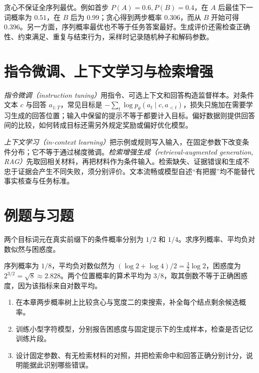 贪心不保证全序列最优。例如首步 $P(A)=0.6,P(B)=0.4$，在 $A$ 后最佳下一词概率为 $0.51$，在 $B$ 后为 $0.99$；贪心得到两步概率 $0.306$，而从 $B$ 开始可得 $0.396$。另一方面，序列概率最优也不等于任务答案最好。生成评价还需检查正确性、约束满足、重复与结束行为，采样时记录随机种子和解码参数。

\section{指令微调、上下文学习与检索增强}
\emph{指令微调（instruction tuning）}用指令、可选上下文和回答构造监督样本。对条件文本 $c$ 与回答 $a_{1:T}$，常见目标是 $-\sum_t\log p_\theta(a_t\mid c,a_{<t})$，损失只施加在需要学习生成的回答位置；输入中保留的提示不等于都要计入目标。偏好数据则提供回答间的比较，如何转成目标还需另外规定奖励或偏好优化模型。

\emph{上下文学习（in-context learning）}把示例或规则写入输入，在固定参数下改变条件分布；它不等于通过梯度微调。\emph{检索增强生成（retrieval-augmented generation, RAG）}先取回相关材料，再把材料作为条件输入。检索缺失、证据错误和生成不忠于证据会产生不同失败，须分别评价。文本流畅或模型自述“有把握”均不能替代事实核查与任务标准。

\section{例题与习题}
\begin{example}[计算词元困惑度]
两个目标词元在真实前缀下的条件概率分别为 $1/2$ 和 $1/4$。求序列概率、平均负对数似然与困惑度。
\end{example}
\begin{solve}
序列概率为 $1/8$，平均负对数似然为 $(\log2+\log4)/2=\frac32\log2$，困惑度为 $2^{3/2}=\sqrt8\approx2.828$。两个位置概率的算术平均为 $3/8$，取其倒数不等于正确困惑度，因为该指标来自对数平均。
\end{solve}
\begin{enumerate}
\item 在本章两步概率树上比较贪心与宽度二的束搜索，补全每个结点剩余候选概率。
\item 训练小型字符模型，分别报告困惑度与固定提示下的生成样本，检查是否记忆训练片段。
\item 设计固定参数、有无检索材料的对照，并把检索命中和回答正确分别计分，说明能据此识别哪些错误。
\end{enumerate}

